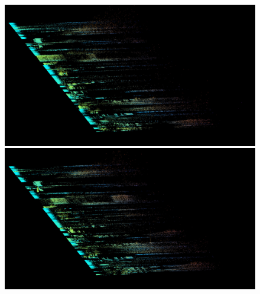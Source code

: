 \documentclass{article}
\begin{document}
\begin{figure}

\begin{multicols}{2}
    \includegraphics[width=\linewidth]{preset-50-11.jpg}%
    \includegraphics[width=\linewidth]{preset-50-12.jpg}%
\end{multicols}


\end{figure}
\end{document}
